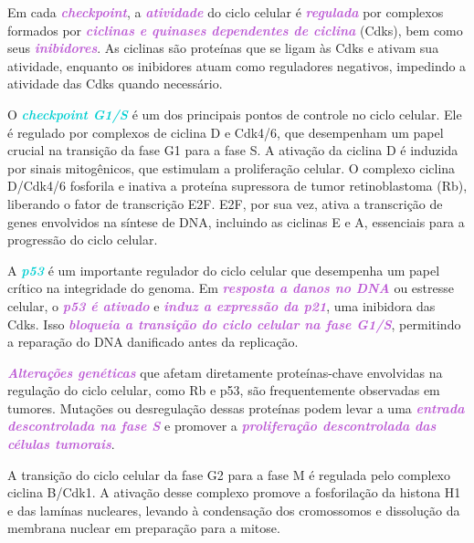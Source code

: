 \documentclass[11pt,a4paper]{article}
\begin{document}
	Em cada \textcolor{MediumOrchid}{\textbf{\textit{checkpoint}}}, a \textcolor{MediumOrchid}{\textbf{\textit{atividade}}} do ciclo celular é \textcolor{MediumOrchid}{\textbf{\textit{regulada}}} por complexos formados por \textcolor{MediumOrchid}{\textbf{\textit{ciclinas e quinases dependentes de ciclina}}} (Cdks), bem como seus \textcolor{MediumOrchid}{\textbf{\textit{inibidores}}}. As ciclinas são proteínas que se ligam às Cdks e ativam sua atividade, enquanto os inibidores atuam como reguladores negativos, impedindo a atividade das Cdks quando necessário.

	O \textcolor{DarkTurquoise}{\textbf{\textit{checkpoint G1/S}}} é um dos principais pontos de controle no ciclo celular. Ele é regulado por complexos de ciclina D e Cdk4/6, que desempenham um papel crucial na transição da fase G1 para a fase S. A ativação da ciclina D é induzida por sinais mitogênicos, que estimulam a proliferação celular. O complexo ciclina D/Cdk4/6 fosforila e inativa a proteína supressora de tumor retinoblastoma (Rb), liberando o fator de transcrição E2F. E2F, por sua vez, ativa a transcrição de genes envolvidos na síntese de DNA, incluindo as ciclinas E e A, essenciais para a progressão do ciclo celular.

	A \textcolor{DarkTurquoise}{\textbf{\textit{p53}}} é um importante regulador do ciclo celular que desempenha um papel crítico na integridade do genoma. Em \textcolor{MediumOrchid}{\textbf{\textit{resposta a danos no DNA}}} ou estresse celular, o \textcolor{MediumOrchid}{\textbf{\textit{p53 é ativado}}} e \textcolor{MediumOrchid}{\textbf{\textit{induz a expressão da p21}}}, uma inibidora das Cdks. Isso \textcolor{MediumOrchid}{\textbf{\textit{bloqueia a transição do ciclo celular na fase G1/S}}}, permitindo a reparação do DNA danificado antes da replicação.

	\textcolor{MediumOrchid}{\textbf{\textit{Alterações genéticas}}} que afetam diretamente proteínas-chave envolvidas na regulação do ciclo celular, como Rb e p53, são frequentemente observadas em tumores. Mutações ou desregulação dessas proteínas podem levar a uma \textcolor{MediumOrchid}{\textbf{\textit{entrada descontrolada na fase S}}} e promover a \textcolor{MediumOrchid}{\textbf{\textit{proliferação descontrolada das células tumorais}}}.

	A transição do ciclo celular da fase G2 para a fase M é regulada pelo complexo ciclina B/Cdk1. A ativação desse complexo promove a fosforilação da histona H1 e das lamínas nucleares, levando à condensação dos cromossomos e dissolução da membrana nuclear em preparação para a mitose.
\end{document}
